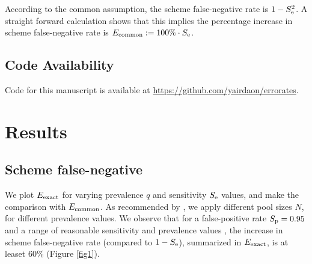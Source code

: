 \documentclass{article}
\begin{document}
According to the common assumption, the scheme false-negative rate is
$1-S_\text{e}^2$. A straight forward calculation shows that this implies the
percentage increase in scheme false-negative rate is $E_{\text{{common}}} :=
100\%\cdot S_\text{e}$.

\subsection*{Code Availability}
Code for this manuscript is available at
\url{https://github.com/yairdaon/errorates}.

\section*{Results}\label{section:results}
\subsection*{Scheme false-negative}
We plot $E_{\text{{exact}}}$ for varying prevalence $q$ and sensitivity $S_\text{e}$
values, and make the comparison with $E_{\text{{common}}}$. As recommended by
\cite{DorfmanYuvalDor}, we apply different pool sizes $N$, for
different prevalence values. We observe that for a false-positive rate
$S_\text{p}=0.95$ \cite{DorfmanYuvalDor} and a range of reasonable
sensitivity and prevalence values \cite{KitComparison,
  InterpretingCOVID19Test, EstimatingRatesLourenco,
  FalsePositiveEstimate}, the increase in scheme false-negative rate
(compared to $1-S_\text{e}$), summarized in $E_{\text{{exact}}}$, is at leaset
$60\%$ (Figure \ref{fig1}).
\end{document}
